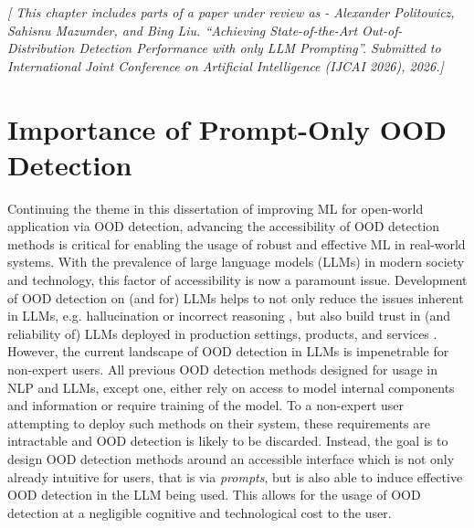 \textit{[ This chapter includes parts of a paper under review as - Alexander Politowicz, Sahisnu Mazumder, and Bing Liu. “Achieving State-of-the-Art Out-of-Distribution Detection Performance with only LLM Prompting”. Submitted to International Joint Conference on Artificial Intelligence (IJCAI 2026), 2026.]}

\section{Importance of Prompt-Only OOD Detection}
\label{sec:propwork-atpo}

Continuing the theme in this dissertation of improving ML for open-world application via OOD detection, advancing the accessibility of OOD detection methods is critical for enabling the usage of robust and effective ML in real-world systems. With the prevalence of large language models (LLMs) in modern society and technology, this factor of accessibility is now a paramount issue. Development of OOD detection on (and for) LLMs helps to not only reduce the issues inherent in LLMs, e.g. hallucination or incorrect reasoning \cite{sriramanan2024llm}, but also build trust in (and reliability of) LLMs deployed in production settings, products, and services \cite{liu2023good,ouyang2025textual}. However, the current landscape of OOD detection in LLMs is impenetrable for non-expert users. All previous OOD detection methods designed for usage in NLP and LLMs, except one, either rely on access to model internal components and information or require training of the model. To a non-expert user attempting to deploy such methods on their system, these requirements are intractable and OOD detection is likely to be discarded. Instead, the goal is to design OOD detection methods around an accessible interface which is not only already intuitive for users, that is via \textit{prompts}, but is also able to induce effective OOD detection in the LLM being used. This allows for the usage of OOD detection at a negligible cognitive and technological cost to the user.

